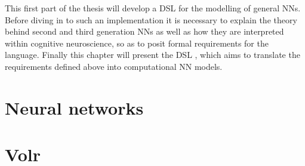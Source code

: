 \documentclass[report.tex]{subfiles}
\begin{document}
This first part of the thesis will develop a \gls{DSL} for
the modelling of general \gls{NN}s.
Before diving in to such an implementation it is necessary
to explain the theory behind second and third generation
\gls{NN}s as well as how they are interpreted within cognitive
neuroscience, so as to posit formal requirements for the language. 
Finally this chapter will present the \gls{DSL} ,
which aims to translate the requirements defined
above into computational \gls{NN} models.

\section{Neural networks}





\section{Volr}
\end{document}
